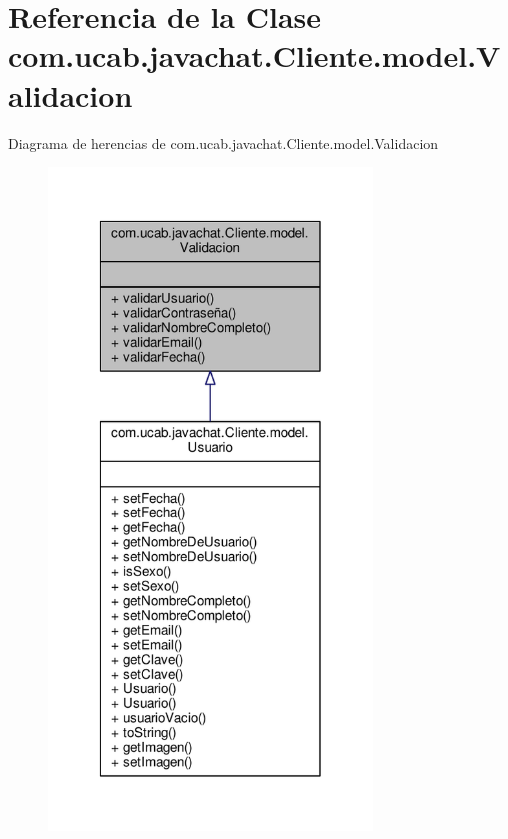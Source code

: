 \hypertarget{classcom_1_1ucab_1_1javachat_1_1_cliente_1_1model_1_1_validacion}{\section{Referencia de la Clase com.\-ucab.\-javachat.\-Cliente.\-model.\-Validacion}
\label{classcom_1_1ucab_1_1javachat_1_1_cliente_1_1model_1_1_validacion}
}


Diagrama de herencias de com.\-ucab.\-javachat.\-Cliente.\-model.\-Validacion
\nopagebreak
\begin{figure}[H]
\begin{center}
\leavevmode
\includegraphics[width=244pt]{d4/d40/classcom_1_1ucab_1_1javachat_1_1_cliente_1_1model_1_1_validacion__inherit__graph}
\end{center}
\end{figure}


